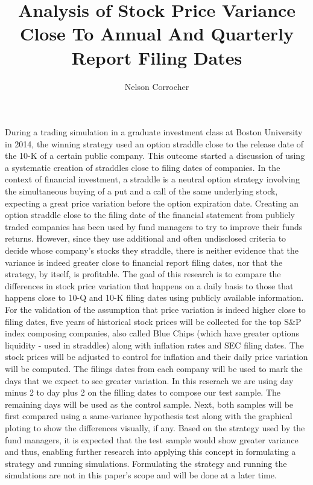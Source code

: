 \documentclass[english,man]{apa6}
\title{Analysis of Stock Price Variance Close To Annual And Quarterly Report
Filing Dates}
\author{Nelson Corrocher}
\affiliation{
    \vspace{0.5cm}
          \textsuperscript{} Harrisburg University  }
\begin{document}
\maketitle

\setcounter{secnumdepth}{0}



During a trading simulation in a graduate investment class at Boston
University in 2014, the winning strategy used an option straddle close
to the release date of the 10-K of a certain public company. This
outcome started a discussion of using a systematic creation of straddles
close to filing dates of companies. In the context of financial
investment, a straddle is a neutral option strategy involving the
simultaneous buying of a put and a call of the same underlying stock,
expecting a great price variation before the option expiration date.
Creating an option straddle close to the filing date of the financial
statement from publicly traded companies has been used by fund managers
to try to improve their funds returns. However, since they use
additional and often undisclosed criteria to decide whose company's
stocks they straddle, there is neither evidence that the variance is
indeed greater close to financial report filing dates, nor that the
strategy, by itself, is profitable. The goal of this research is to
compare the differences in stock price variation that happens on a daily
basis to those that happens close to 10-Q and 10-K filing dates using
publicly available information. For the validation of the assumption
that price variation is indeed higher close to filing dates, five years
of historical stock prices will be collected for the top S\&P index
composing companies, also called Blue Chips (which have greater options
liquidity - used in straddles) along with inflation rates and SEC filing
dates. The stock prices will be adjusted to control for inflation and
their daily price variation will be computed. The filings dates from
each company will be used to mark the days that we expect to see greater
variation. In this reserach we are using day minus 2 to day plus 2 on
the filling dates to compose our test sample. The remaining days will be
used as the control sample. Next, both samples will be first compared
using a same-variance hypothesis test along with the graphical ploting
to show the differences visually, if any. Based on the strategy used by
the fund managers, it is expected that the test sample would show
greater variance and thus, enabling further research into applying this
concept in formulating a strategy and running simulations. Formulating
the strategy and running the simulations are not in this paper's scope
and will be done at a later time.
\end{document}
